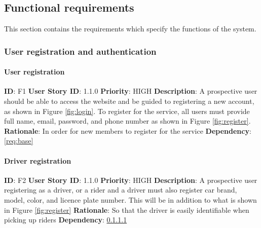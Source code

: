 \documentclass{article}
\begin{document}

\subsection{Functional requirements}
This section contains the requirements which specify the functions of the system.


\subsubsection{User registration and authentication}

\paragraph{User registration}\label{req:registration}
\textbf{ID}: F1\newline
\textbf{User Story ID}: 1.1.0\newline
\textbf{Priority}: HIGH\newline
\textbf{Description}: A prospective user should be able to access the website and be guided to registering a new account, as shown in Figure \ref{fig:login}. To register for the service, all users must provide full name, email, password, and phone number as shown in Figure \ref{fig:register}.\newline
\textbf{Rationale}: In order for new members to register for the service\newline
\textbf{Dependency}: \ref{req:base}

\paragraph{Driver registration}\label{req:driverRegistration}
\textbf{ID}: F2\newline
\textbf{User Story ID}: 1.1.0\newline
\textbf{Priority}: HIGH\newline
\textbf{Description}: A prospective user registering as a driver, or a rider and a driver must also register car brand, model, color, and licence plate number. This will be in addition to what is shown in Figure \ref{fig:register}\newline
\textbf{Rationale}: So that the driver is easily identifiable when picking up riders\newline
\textbf{Dependency}: \ref{req:registration}\newline
\end{document}
